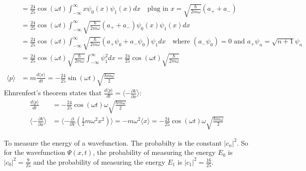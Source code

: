 \documentclass{article}
\begin{document}
\begin{align*}
	&= \frac{24}{25} \cos(\omega t) \int_{-\infty}^{\infty} x \psi_0(x) \psi_1(x) dx \quad \text{plug in } x = \sqrt{\frac{\hbar}{2 m \omega}} (a_+ + a_-) \\
	&= \frac{24}{25} \cos(\omega t) \int_{-\infty}^{\infty} \sqrt{\frac{\hbar}{2 m \omega}} (a_+ + a_-) \psi_0(x) \psi_1(x) dx \\
	&= \frac{24}{25} \cos(\omega t) \int_{-\infty}^{\infty} \sqrt{\frac{\hbar}{2 m \omega}} (a_+ \psi_0 + a_- \psi_0) \psi_1 dx \quad \text{where } (a_- \psi_0) = 0 \text{ and } a_+\psi_n = \sqrt{n+1} \psi_n\\
	&= \frac{24}{25} \cos(\omega t) \sqrt{\frac{\hbar}{2 m \omega}} \int_{-\infty}^{\infty}  \psi_1^2 dx = \frac{24}{25} \cos(\omega t) \sqrt{\frac{\hbar}{2 m \omega}} \\
	\\
	\langle p \rangle &= m \frac{d \langle x \rangle}{dt} = -\frac{24}{25} \sin(\omega t) \sqrt{\frac{\hbar m \omega}{2}}
\end{align*} 
\endgroup
Ehnrenfest's theorem states that \(\frac{d \langle p \rangle}{dt} = \langle -\frac{\partial V}{\partial x} \rangle \):
\begin{align*}
	\frac{d \langle p \rangle}{dt} &= -\frac{24}{25} \cos(\omega t) \omega \sqrt{\frac{\hbar m \omega}{2}} \\
	\langle -\frac{\partial V}{\partial x} \rangle &= \langle - \frac{\partial}{\partial V} \left(\frac{1}{2} m \omega^2 x^2\right) \rangle = -m \omega^2 \langle x \rangle = -\frac{24}{25} \cos(\omega t) \omega \sqrt{\frac{\hbar m \omega}{2}}
\end{align*}

\noindent To measure the energy of a wavefunction. The probabilty is the constant \(|c_n|^2\). So for the wavefunction \(\Psi(x,t)\), the probability of measuring the energy \(E_0\) is \(|c_0|^2 = \frac{9}{25}\) and the probability of measuring the energy \(E_1\) is \(|c_1|^2 = \frac{16}{25}\).
\end{document}
